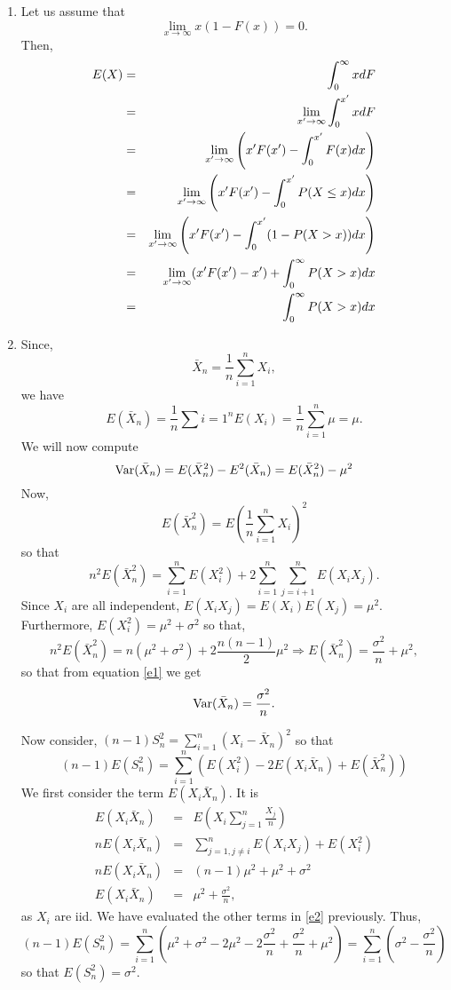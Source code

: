 \documentclass{article}
\begin{document}
\begin{enumerate}
\item Let us assume that
\[
\lim_{x \rightarrow \infty} x(1 - F(x)) = 0.
\]
Then,
\begin{eqnarray*}
E(X) &=& \int_0^\infty xdF \\
 &=& \lim_{x^\prime\rightarrow\infty}\int_0^{x^\prime}xdF \\
 &=& \lim_{x^\prime\rightarrow\infty}\left(x^\prime F(x^\prime)-\int_0^{x^\prime}F(x)dx\right)\\
 &=& \lim_{x^\prime\rightarrow\infty}\left(x^\prime F(x^\prime) - \int_0^{x^\prime}P(X \le x) dx \right) \\
 &=& \lim_{x^\prime\rightarrow\infty}\left(x^\prime F(x^\prime) - \int_0^{x^\prime}(1 - P(X > x)) dx \right) \\
 &=& \lim_{x^\prime\rightarrow\infty}(x^\prime F(x^\prime) - x^\prime) + \int_0^\infty P(X > x)dx \\
 &=&  \int_0^\infty P(X > x)dx
\end{eqnarray*}

\item Since,
\[
\bar{X}_n = \frac{1}{n}\sum_{i = 1}^n X_i,
\]
we have
\[
E(\bar{X}_n) = \frac{1}{n}\sum{i=1}^nE(X_i) = \frac{1}{n}\sum_{i=1}^n\mu = \mu.
\]
We will now compute
\begin{equation}\label{e1}
\operatorname{Var}(\bar{X}_n) = E(\bar{X}_n^2) - E^2(\bar{X}_n) = E(\bar{X}_n^2) - \mu^2
\end{equation}
Now,
\[
E(\bar{X}_n^2) = E\left(\frac{1}{n}\sum_{i=1}^nX_i\right)^2
\]
so that
\[
n^2E(\bar{X}_n^2) = \sum_{i=1}^n E(X_i^2) + 2\sum_{i=1}^n\sum_{j=i+1}^n E(X_iX_j).
\]
Since $X_i$ are all independent, $E(X_iX_j) = E(X_i)E(X_j) = \mu^2$. Furthermore,
$E(X_i^2) = \mu^2 + \sigma^2$ so that,
\[
n^2E(\bar{X}_n^2) = n(\mu^2 + \sigma^2) + 2\frac{n(n-1)}{2}\mu^2 \Rightarrow
E(\bar{X}_n^2) = \frac{\sigma^2}{n} + \mu^2,
\]
so that from equation \eqref{e1} we get
\[
\operatorname{Var}(\bar{X}_n) = \frac{\sigma^2}{n}.
\]

Now consider, $(n-1)S_n^2 = \sum_{i=1}^n(X_i - \bar{X}_n)^2$ so that
\begin{equation}\label{e2}
(n-1)E(S_n^2) = \sum_{i=1}^n\left(E(X_i^2) - 2E(X_i\bar{X}_n) + E(\bar{X}_n^2)\right)
\end{equation}
We first consider the term $E(X_i\bar{X}_n)$. It is
\begin{eqnarray*}
E(X_i\bar{X}_n) &=& E\left(X_i \sum_{j=1}^n\frac{X_j}{n}\right) \\
nE(X_i\bar{X}_n) &=& \sum_{j=1, j\ne i}^n E(X_iX_j) + E(X_i^2) \\
nE(X_i\bar{X}_n) &=& (n-1)\mu^2 + \mu^2 + \sigma^2 \\
E(X_i\bar{X}_n) &=& \mu^2 + \frac{\sigma^2}{n},
\end{eqnarray*}
as $X_i$ are iid. We have evaluated the other terms in \eqref{e2} previously.
Thus,
\[
(n-1)E(S_n^2) =\sum_{i=1}^n
\left(\mu^2+\sigma^2-2\mu^2-2\frac{\sigma^2}{n}+\frac{\sigma^2}{n}+\mu^2\right)
= \sum_{i=1}^n\left(\sigma^2 - \frac{\sigma^2}{n}\right)
\]
so that $E(S_n^2) = \sigma^2$.


\end{enumerate}
\end{document}
